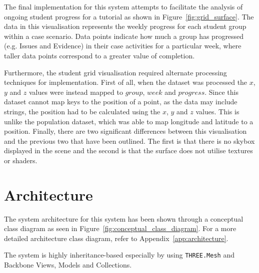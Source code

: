 {	

	The final implementation for this system attempts to facilitate the analysis of ongoing student progress for a tutorial as shown in Figure~\ref{fig:grid_surface}. The data in this visualisation represents the weekly progress for each student group within a case scenario. Data points indicate how much a group has progressed (e.g. Issues and Evidence) in their case activities for a particular week, where taller data points correspond to a greater value of completion.

	

	Furthermore, the student grid visualisation required alternate processing techniques for implementation. First of all, when the dataset was processed the $x$, $y$ and $z$ values were instead mapped to $group$, $week$ and $progress$. Since this dataset cannot map keys to the position of a point, as the data may include strings, the position had to be calculated using the $x$, $y$ and $z$ values. This is unlike the population dataset, which was able to map longitude and latitude to a position. Finally, there are two significant differences between this visualisation and the previous two that have been outlined. The first is that there is no skybox displayed in the scene and the second is that the surface does not utilise textures or shaders.
	
}

\section{Architecture} {
\label{sec:architecture}

	The system architecture for this system has been shown through a conceptual class diagram as seen in Figure~\ref{fig:conceptual_class_diagram}. For a more detailed architecture class diagram, refer to Appendix~\ref{app:architecture}.

	

	The system is highly inheritance-based especially by using \texttt{THREE.Mesh} and Backbone Views, Models and Collections.

}

